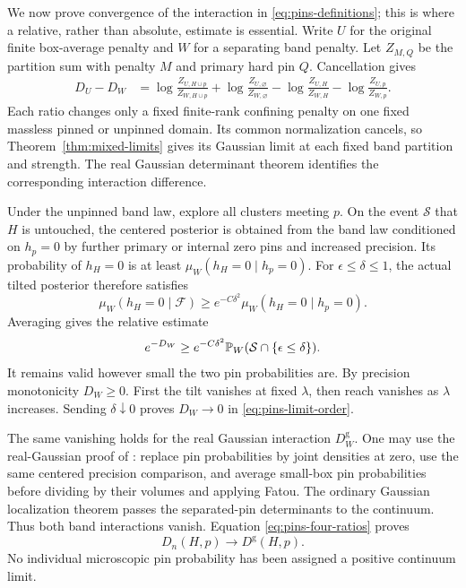 We now prove convergence of the interaction in
\eqref{eq:pins-definitions}; this is where a relative,
rather than absolute, estimate is essential.
Write \(U\) for the original finite box-average
penalty and \(W\) for a separating band penalty.
Let \(Z_{M,Q}\) be the partition sum with penalty
\(M\) and primary hard pin \(Q\). Cancellation gives
\begin{align}
 D_U-D_W
 &=\log\frac{Z_{U,H\cup p}}{Z_{W,H\cup p}}
   +\log\frac{Z_{U,\varnothing}}{Z_{W,\varnothing}}
   -\log\frac{Z_{U,H}}{Z_{W,H}}
   -\log\frac{Z_{U,p}}{Z_{W,p}}.
 \label{eq:pins-four-ratios}
\end{align}
Each ratio changes only a fixed finite-rank confining
penalty on one fixed massless pinned or unpinned
domain. Its common normalization cancels, so
Theorem~\ref{thm:mixed-limits} gives its Gaussian
limit at each fixed band partition and strength.
The real Gaussian determinant theorem
 identifies the
corresponding interaction difference.

Under the unpinned band law, explore all clusters
meeting \(p\). On the event \(\mathcal S\) that
\(H\) is untouched, the centered posterior is
obtained from the band law conditioned on \(h_p=0\)
by further primary or internal zero pins and
increased precision. Its probability of \(h_H=0\)
is at least \(\mu_W(h_H=0\mid h_p=0)\).
For \(\epsilon\le\delta\le1\), the actual tilted
posterior therefore satisfies
\[
 \mu_W(h_H=0\mid\mathcal F)
 \ge e^{-C\delta^2}\mu_W(h_H=0\mid h_p=0).
\]
Averaging gives the relative estimate
\begin{equation}
 e^{-D_W}\ge e^{-C\delta^2}
                 \mathbb P_W(\mathcal S\cap\{\epsilon\le\delta\}).
 \label{eq:pins-relative-pin}
\end{equation}
It remains valid however small the two pin
probabilities are. By precision monotonicity
\(D_W\ge0\). First the tilt vanishes at fixed
\(\lambda\), then reach vanishes as \(\lambda\)
increases. Sending \(\delta\downarrow0\) proves
\(D_W\to0\) in \eqref{eq:pins-limit-order}.

The same vanishing holds for the real Gaussian
interaction \(D_W^{\mathrm g}\). One may use the
real-Gaussian proof of :
replace pin probabilities by joint densities at
zero, use the same centered precision comparison,
and average small-box pin probabilities before
dividing by their volumes and applying Fatou.
The ordinary Gaussian localization theorem passes
the separated-pin determinants to the continuum.
Thus both band interactions vanish. Equation
\eqref{eq:pins-four-ratios} proves
\begin{equation}
                         D_n(H,p)\longrightarrow D^{\mathrm g}(H,p).
 \label{eq:pins-interaction-limit}
\end{equation}
No individual microscopic pin probability has been
assigned a positive continuum limit.


